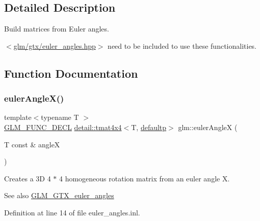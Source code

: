 \subsection{Detailed Description}
Build matrices from Euler angles. 

$<$\hyperlink{euler__angles_8hpp}{glm/gtx/euler\+\_\+angles.\+hpp}$>$ need to be included to use these functionalities. 

\subsection{Function Documentation}
\mbox{\label{group__gtx__euler__angles_ga97994e53d856ae89ed2622d66ab86c2c}} 
\subsubsection{\texorpdfstring{euler\+Angle\+X()}{eulerAngleX()}}
{\footnotesize\ttfamily template$<$typename T $>$ \\
\hyperlink{setup_8hpp_ab2d052de21a70539923e9bcbf6e83a51}{G\+L\+M\+\_\+\+F\+U\+N\+C\+\_\+\+D\+E\+CL} \hyperlink{structglm_1_1detail_1_1tmat4x4}{detail\+::tmat4x4}$<$T, \hyperlink{namespaceglm_a0f04f086094c747d227af4425893f545a9d21ccd8b5a009ec7eb7677befc3bf51}{defaultp}$>$ glm\+::euler\+AngleX (\begin{DoxyParamCaption}\item[{T const \&}]{angleX }\end{DoxyParamCaption})}

Creates a 3D 4 $\ast$ 4 homogeneous rotation matrix from an euler angle X. \begin{DoxySeeAlso}{See also}
\hyperlink{group__gtx__euler__angles}{G\+L\+M\+\_\+\+G\+T\+X\+\_\+euler\+\_\+angles} 
\end{DoxySeeAlso}


Definition at line 14 of file euler\+\_\+angles.\+inl.

\mbox{\label{group__gtx__euler__angles_ga83a52d36fd752c92ce189197b51ea785}} 
